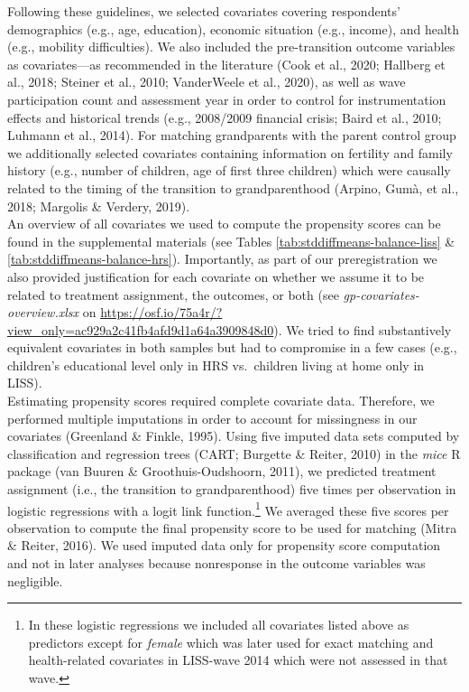 \documentclass[
  english,
  man, noextraspace]{apa7}
\begin{document}
Following these guidelines, we selected covariates covering respondents' demographics (e.g., age, education), economic situation (e.g., income), and health (e.g., mobility difficulties). We also included the pre-transition outcome variables as covariates---as recommended in the literature (Cook et al., 2020; Hallberg et al., 2018; Steiner et al., 2010; VanderWeele et al., 2020), as well as wave participation count and assessment year in order to control for instrumentation effects and historical trends (e.g., 2008/2009 financial crisis; Baird et al., 2010; Luhmann et al., 2014). For matching grandparents with the parent control group we additionally selected covariates containing information on fertility and family history (e.g., number of children, age of first three children) which were causally related to the timing of the transition to grandparenthood (Arpino, Gumà, et al., 2018; Margolis \& Verdery, 2019).\\
An overview of all covariates we used to compute the propensity scores can be found in the supplemental materials (see Tables \ref{tab:stddiffmeans-balance-liss} \& \ref{tab:stddiffmeans-balance-hrs}). Importantly, as part of our preregistration we also provided justification for each covariate on whether we assume it to be related to treatment assignment, the outcomes, or both (see \emph{gp-covariates-overview.xlsx} on \url{https://osf.io/75a4r/?view_only=ac929a2c41fb4afd9d1a64a3909848d0}). We tried to find substantively equivalent covariates in both samples but had to compromise in a few cases (e.g., children's educational level only in HRS vs.~children living at home only in LISS).\\
Estimating propensity scores required complete covariate data. Therefore, we performed multiple imputations in order to account for missingness in our covariates (Greenland \& Finkle, 1995). Using five imputed data sets computed by classification and regression trees (CART; Burgette \& Reiter, 2010) in the \emph{mice} R package (van Buuren \& Groothuis-Oudshoorn, 2011), we predicted treatment assignment (i.e., the transition to grandparenthood) five times per observation in logistic regressions with a logit link function.\footnote{In these logistic regressions we included all covariates listed above as predictors except for \emph{female} which was later used for exact matching and health-related covariates in LISS-wave 2014 which were not assessed in that wave.} We averaged these five scores per observation to compute the final propensity score to be used for matching (Mitra \& Reiter, 2016). We used imputed data only for propensity score computation and not in later analyses because nonresponse in the outcome variables was negligible.
\end{document}
